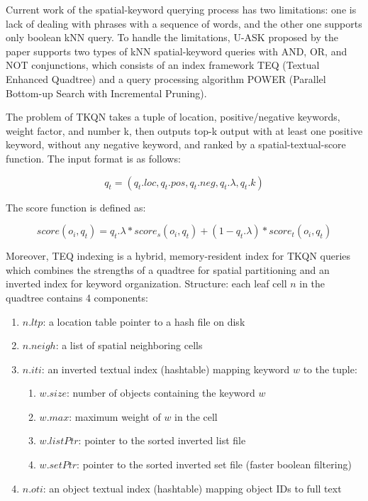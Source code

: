 \documentclass[]{IEEEphot}
\begin{document}
Current work of the spatial-keyword querying process has two limitations: one is lack of dealing with phrases with a sequence of words, and the other one supports only boolean kNN query. To handle the limitations, U-ASK proposed by the paper supports two types of kNN spatial-keyword queries with AND, OR, and NOT conjunctions, which consists of an index framework TEQ (Textual Enhanced Quadtree) and a query processing algorithm POWER (Parallel Bottom-up Search with Incremental Pruning).

The problem of TKQN takes a tuple of location, positive/negative keywords, weight factor, and number k, then outputs top-k output with at least one positive keyword, without any negative keyword, and ranked by a spatial-textual-score function. The input format is as follows:

$$q_t = (q_t.loc, q_t.pos, q_t.neg, q_t.\lambda, q_t.k)$$

The score function is defined as:

$$score(o_i, q_t) = q_t.\lambda * score_s(o_i, q_t) + (1 - q_t.\lambda) * score_t(o_i, q_t)$$

Moreover, TEQ indexing is a hybrid, memory-resident index for TKQN queries which combines the strengths of a quadtree for spatial partitioning and an inverted index for keyword organization. Structure: each leaf cell $n$ in the quadtree contains 4 components:

\begin{enumerate}
    \item $n.ltp$: a location table pointer to a hash file on disk
    \item $n.neigh$: a list of spatial neighboring cells
    \item $n.iti$: an inverted textual index (hashtable) mapping keyword $w$ to the tuple:
          \begin{enumerate}
              \item $w.size$: number of objects containing the keyword $w$
              \item $w.max$: maximum weight of $w$ in the cell
              \item $w.listPtr$: pointer to the sorted inverted list file
              \item $w.setPtr$: pointer to the sorted inverted set file (faster boolean filtering)
          \end{enumerate}
    \item $n.oti$: an object textual index (hashtable) mapping object IDs to full text
\end{enumerate}
\end{document}
